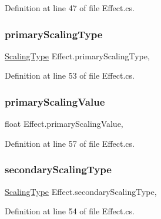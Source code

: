 Definition at line 47 of file Effect.\+cs.

\mbox{\label{class_effect_a008086eef4214cbf113387f8ac5ed1cc}} 
\subsubsection{\texorpdfstring{primaryScalingType}{primaryScalingType}}
{\footnotesize\ttfamily \mbox{\hyperlink{class_effect_af0ada789de40f58c24c46bf8ed2f300c}{Scaling\+Type}} Effect.\+primary\+Scaling\+Type\hspace{0.3cm}{\ttfamily [get]}, {\ttfamily [set]}}



Definition at line 53 of file Effect.\+cs.

\mbox{\label{class_effect_ae5beb1965b997d1521bc8a268e963883}} 
\subsubsection{\texorpdfstring{primaryScalingValue}{primaryScalingValue}}
{\footnotesize\ttfamily float Effect.\+primary\+Scaling\+Value\hspace{0.3cm}{\ttfamily [get]}, {\ttfamily [set]}}



Definition at line 57 of file Effect.\+cs.

\mbox{\label{class_effect_a790aa2e053b911e609f7655f4d39707c}} 
\subsubsection{\texorpdfstring{secondaryScalingType}{secondaryScalingType}}
{\footnotesize\ttfamily \mbox{\hyperlink{class_effect_af0ada789de40f58c24c46bf8ed2f300c}{Scaling\+Type}} Effect.\+secondary\+Scaling\+Type\hspace{0.3cm}{\ttfamily [get]}, {\ttfamily [set]}}



Definition at line 54 of file Effect.\+cs.

